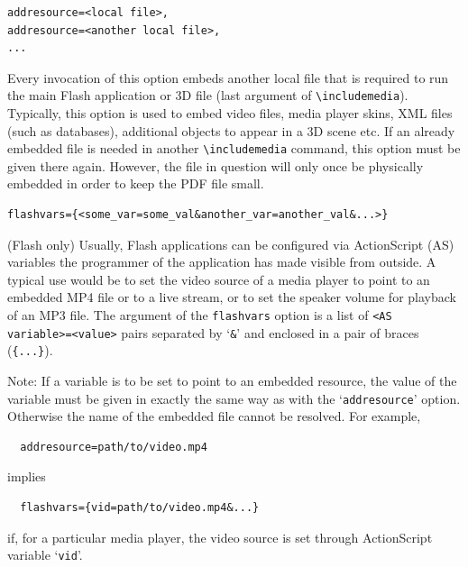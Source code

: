 \documentclass[a4paper]{article}
\begin{document}
\begin{verbatim}
addresource=<local file>,
addresource=<another local file>,
...
\end{verbatim}
Every invocation of this option embeds another local file that is required to run the main Flash application or 3D file (last argument of \verb+\includemedia+). Typically, this option is used to embed video files, media player skins, XML files (such as databases), additional objects to appear in a 3D scene etc. If an already embedded file is needed in another \verb+\includemedia+ command, this option must be given there again. However, the file in question will only once be physically embedded in order to keep the PDF file small.
\begin{verbatim}
flashvars={<some_var=some_val&another_var=another_val&...>}
\end{verbatim}
(Flash only) Usually, Flash applications can be configured via ActionScript (AS) variables the programmer of the application has made visible from outside. A typical use would be to set the video source of a media player to point to an embedded MP4 file or to a live stream, or to set the speaker volume for playback of an MP3 file. The argument of the \verb+flashvars+ option is a list of \verb+<AS variable>=<value>+ pairs separated by `\verb+&+' and enclosed in a pair of braces (\verb+{...}+).

Note: If a variable is to be set to point to an embedded resource, the value of the variable must be given in exactly the same way as with the `\verb+addresource+' option. Otherwise the name of the embedded file cannot be resolved. For example,
\begin{verbatim}
  addresource=path/to/video.mp4
\end{verbatim}
implies
\begin{verbatim}
  flashvars={vid=path/to/video.mp4&...}
\end{verbatim}
if, for a particular media player, the video source is set through ActionScript variable `\verb+vid+'.
\end{document}
